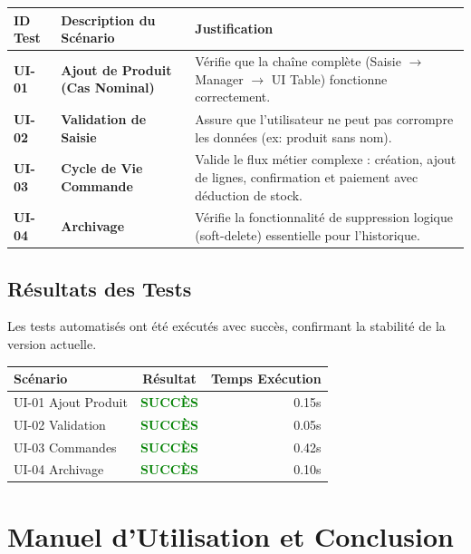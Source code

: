 \documentclass[12pt,a4paper]{report}
\newcommand{\statuspass}{\textcolor{green}{\textbf{SUCCÈS}}}
\begin{document}
\begin{longtable}{|p{2cm}|p{8cm}|p{4cm}|}
\hline
\textbf{ID Test} & \textbf{Description du Scénario} & \textbf{Justification} \\
\hline
\endhead

\textbf{UI-01} & \textbf{Ajout de Produit (Cas Nominal)} &
Vérifie que la chaîne complète (Saisie $\rightarrow$ Manager $\rightarrow$ UI Table) fonctionne correctement. \\
\hline

\textbf{UI-02} & \textbf{Validation de Saisie} &
Assure que l'utilisateur ne peut pas corrompre les données (ex: produit sans nom). \\
\hline

\textbf{UI-03} & \textbf{Cycle de Vie Commande} &
Valide le flux métier complexe : création, ajout de lignes, confirmation et paiement avec déduction de stock. \\
\hline

\textbf{UI-04} & \textbf{Archivage} &
Vérifie la fonctionnalité de suppression logique (soft-delete) essentielle pour l'historique. \\
\hline
\end{longtable}

\section{Résultats des Tests}
Les tests automatisés ont été exécutés avec succès, confirmant la stabilité de la version actuelle.

\begin{center}
\begin{tabular}{|l|c|r|}
\hline
\textbf{Scénario} & \textbf{Résultat} & \textbf{Temps Exécution} \\
\hline
UI-01 Ajout Produit & \statuspass & 0.15s \\
UI-02 Validation & \statuspass & 0.05s \\
UI-03 Commandes & \statuspass & 0.42s \\
UI-04 Archivage & \statuspass & 0.10s \\
\hline
\end{tabular}
\end{center}

\chapter{Manuel d'Utilisation et Conclusion}
\end{document}
